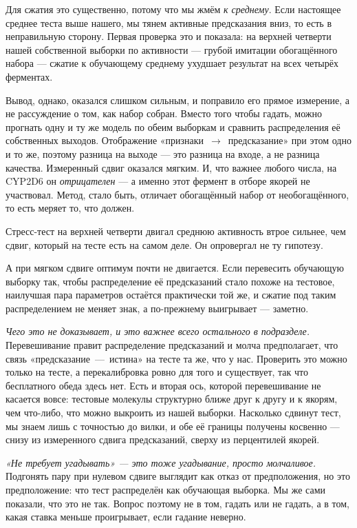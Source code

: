 Для сжатия это существенно, потому что мы жмём \emph{к среднему}. Если настоящее среднее
теста выше нашего, мы тянем активные предсказания вниз, то есть в неправильную сторону.
Первая проверка это и показала: на верхней четверти нашей собственной выборки по активности
--- грубой имитации обогащённого набора --- сжатие к обучающему среднему ухудшает результат
на всех четырёх ферментах.

Вывод, однако, оказался слишком сильным, и поправило его прямое измерение, а не рассуждение
о том, как набор собран. Вместо того чтобы гадать, можно прогнать одну и ту же модель по
обеим выборкам и сравнить распределения её собственных выходов. Отображение
«признаки~$\to$~предсказание» при этом одно и то же, поэтому разница на выходе --- это
разница на входе, а не разница качества. Измеренный сдвиг оказался мягким. И, что важнее
любого числа, на CYP2D6 он \emph{отрицателен} --- а именно этот фермент в отборе якорей не
участвовал. Метод, стало быть, отличает обогащённый набор от необогащённого, то есть меряет
то, что должен.

Стресс-тест на верхней четверти двигал среднюю активность втрое сильнее, чем сдвиг, который
на тесте есть на самом деле. Он опровергал не ту гипотезу.

А при мягком сдвиге оптимум почти не двигается. Если перевесить обучающую выборку так, чтобы
распределение её предсказаний стало похоже на тестовое, наилучшая пара параметров остаётся
практически той же, и сжатие под таким распределением не меняет знак, а по-прежнему
выигрывает --- заметно.

\emph{Чего это не доказывает, и это важнее всего остального в подразделе.} Перевешивание
правит распределение предсказаний и молча предполагает, что связь «предсказание~---~истина»
на тесте та же, что у нас. Проверить это можно только на тесте, а перекалибровка ровно для
того и существует, так что бесплатного обеда здесь нет. Есть и вторая ось, которой
перевешивание не касается вовсе: тестовые молекулы структурно ближе друг к другу и к якорям,
чем что-либо, что можно выкроить из нашей выборки. Насколько сдвинут тест, мы знаем лишь с
точностью до вилки, и обе её границы получены косвенно --- снизу из измеренного сдвига
предсказаний, сверху из перцентилей якорей.

\emph{«Не требует угадывать» --- это тоже угадывание, просто молчаливое.} Подгонять пару при
нулевом сдвиге выглядит как отказ от предположения, но это предположение: что тест
распределён как обучающая выборка. Мы же сами показали, что это не так. Вопрос поэтому не в
том, гадать или не гадать, а в том, какая ставка меньше проигрывает, если гадание неверно.

